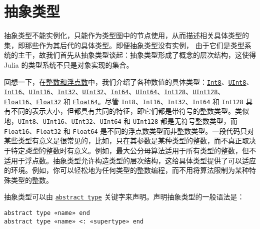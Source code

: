 \hypertarget{5929227155379782502}{}


\section{抽象类型}



抽象类型不能实例化，只能作为类型图中的节点使用，从而描述相关具体类型的集，即那些作为其后代的具体类型。即便抽象类型没有实例， 由于它们是类型系统的主干，故我们首先从抽象类型谈起：抽象类型形成了概念的层次结构，这使得 Julia 的类型系统不只是对象实现的集合。



回想一下，在\hyperlink{8249022581856827126}{整数和浮点数}中，我们介绍了各种数值的具体类型：\hyperlink{5857518405103968275}{\texttt{Int8}}、\hyperlink{6609065134969660118}{\texttt{UInt8}}、\hyperlink{6667287249103968645}{\texttt{Int16}}、\hyperlink{7018610346698168012}{\texttt{UInt16}}、\hyperlink{10103694114785108551}{\texttt{Int32}}、\hyperlink{8690996847580776341}{\texttt{UInt32}}、\hyperlink{7720564657383125058}{\texttt{Int64}}、\hyperlink{5500998675195555601}{\texttt{UInt64}}、\hyperlink{8012327724714767060}{\texttt{Int128}}、\hyperlink{14811222188335428522}{\texttt{UInt128}}、\hyperlink{2727296760866702904}{\texttt{Float16}}、\hyperlink{8101639384272933082}{\texttt{Float32}} 和 \hyperlink{5027751419500983000}{\texttt{Float64}}。尽管 \texttt{Int8}、\texttt{Int16}、\texttt{Int32}、\texttt{Int64} 和 \texttt{Int128} 具有不同的表示大小，但都具有共同的特征，即它们都是带符号的整数类型。类似地，\texttt{UInt8}、\texttt{UInt16}、\texttt{UInt32}、\texttt{UInt64} 和 \texttt{UInt128} 都是无符号整数类型，而 \texttt{Float16}、\texttt{Float32} 和 \texttt{Float64} 是不同的浮点数类型而非整数类型。一段代码只对某些类型有意义是很常见的，比如，只在其参数是某种类型的整数，而不真正取决于特定\emph{类型}的整数时有意义。例如，最大公分母算法适用于所有类型的整数，但不适用于浮点数。抽象类型允许构造类型的层次结构，这给具体类型提供了可以适应的环境。例如，你可以轻松地为任何类型的整数编程，而不用将算法限制为某种特殊类型的整数。



抽象类型可以由 \hyperlink{12403756508738429935}{\texttt{abstract type}} 关键字来声明。声明抽象类型的一般语法是：




\begin{lstlisting}
abstract type «name» end
abstract type «name» <: «supertype» end
\end{lstlisting}



